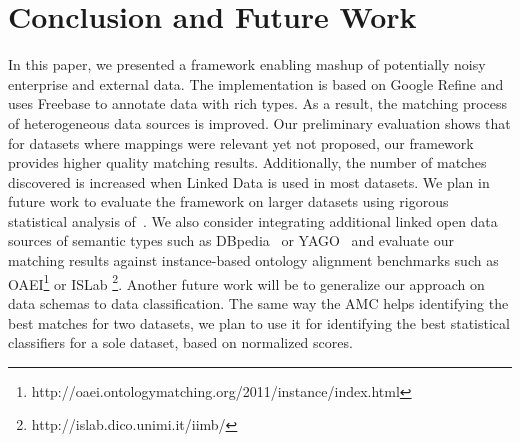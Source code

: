 \documentclass{sig-alternate}
\begin{document}

\section{Conclusion and Future Work}
In this paper, we presented a framework enabling mashup of potentially noisy enterprise and external data. The implementation is based on Google Refine and uses Freebase to annotate data with rich types. As a result, the matching process of heterogeneous data sources is improved. Our preliminary evaluation shows that for datasets where mappings were relevant yet not proposed, our framework provides higher quality matching results. Additionally, the number of matches discovered is increased when Linked Data is used in most datasets. We plan in future work to evaluate the framework on larger datasets using rigorous statistical analysis of~\cite{Fawcett}. We also consider integrating additional linked open data sources of semantic types such as DBpedia~\cite{Auer07dbpedia:a} or YAGO~\cite{Suchanek:2007:YCS:1242572.1242667} and evaluate our matching results against instance-based ontology alignment benchmarks such as OAEI\footnote{http://oaei.ontologymatching.org/2011/instance/index.html} or ISLab \footnote{http://islab.dico.unimi.it/iimb/}. Another future work will be to generalize our approach on data schemas to data classification. The same way the AMC helps identifying the best matches for two datasets, we plan to use it for identifying the best statistical classifiers for a sole dataset, based on normalized scores.

\nocite{*}


\end{document}
